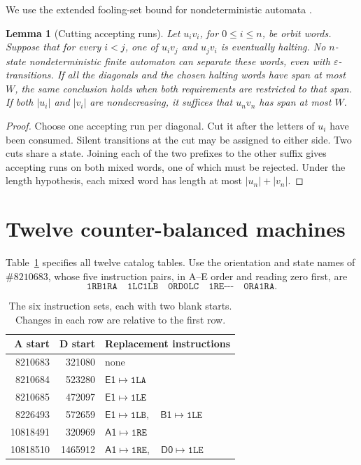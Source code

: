 \documentclass[11pt]{article}
\newtheorem{lemma}[theorem]{Lemma}
\newcommand{\state}[1]{\mathsf{#1}}
\newcommand{\eps}{\varepsilon}
\newcommand{\word}[1]{\texttt{#1}}
\begin{document}
We use the extended fooling-set bound for nondeterministic automata \cite{birget}.

\begin{lemma}[Cutting accepting runs]\label{cut}
Let \(u_i v_i\), for \(0\le i\le n\), be orbit words. Suppose that for every \(i<j\), one of \(u_i v_j\) and \(u_j v_i\) is eventually halting. No \(n\)-state nondeterministic finite automaton can separate these words, even with \(\eps\)-transitions. If all the diagonals and the chosen halting words have span at most \(W\), the same conclusion holds when both requirements are restricted to that span. If both \(|u_i|\) and \(|v_i|\) are nondecreasing, it suffices that \(u_nv_n\) has span at most \(W\).
\end{lemma}
\begin{proof}
Choose one accepting run per diagonal. Cut it after the letters of \(u_i\) have been consumed. Silent transitions at the cut may be assigned to either side. Two cuts share a state. Joining each of the two prefixes to the other suffix gives accepting runs on both mixed words, one of which must be rejected. Under the length hypothesis, each mixed word has length at most \(|u_n|+|v_n|\).
\end{proof}

\section{Twelve counter-balanced machines}\label{balanced}

Table~\ref{pairs} specifies all twelve catalog tables. Use the orientation and state names of \(\#8210683\), whose five instruction pairs, in A--E order and reading zero first, are
\[
\word{1RB1RA}\quad\word{1LC1LB}\quad\word{0RD0LC}\quad
\word{1RE-{}-{}-}\quad\word{0RA1RA}.
\]
\begin{table}[ht]
\centering
\caption{The six instruction sets, each with two blank starts. Changes in each row are relative to the first row.}\label{pairs}
\begin{tabular}{@{}rrl@{}}
\toprule
A start & D start & Replacement instructions\\
\midrule
8210683 & 321080 & none\\
8210684 & 523280 & \(\state{E1}\mapsto\word{1LA}\)\\
8210685 & 472097 & \(\state{E1}\mapsto\word{1LE}\)\\
8226493 & 572659 & \(\state{E1}\mapsto\word{1LB},\quad\state{B1}\mapsto\word{1LE}\)\\
10818491 & 320969 & \(\state{A1}\mapsto\word{1RE}\)\\
10818510 & 1465912 & \(\state{A1}\mapsto\word{1RE},\quad\state{D0}\mapsto\word{1LE}\)\\
\bottomrule
\end{tabular}
\end{table}
\end{document}
